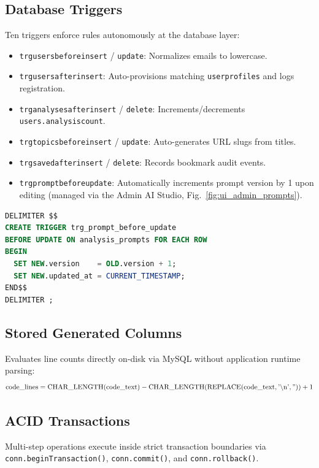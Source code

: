 \documentclass[12pt,a4paper]{report}
\DeclareRobustCommand{\_}{\textunderscore\allowbreak}
\begin{document}
\subsection{Database Triggers}
Ten triggers enforce rules autonomously at the database layer:
\begin{itemize}
    \item \texttt{trg\_users\_before\_insert} / \texttt{update}: Normalizes emails to lowercase.
    \item \texttt{trg\_users\_after\_insert}: Auto-provisions matching \texttt{user\_profiles} and logs registration.
    \item \texttt{trg\_analyses\_after\_insert} / \texttt{delete}: Increments/decrements \texttt{users.analysis\_count}.
    \item \texttt{trg\_topics\_before\_insert} / \texttt{update}: Auto-generates URL slugs from titles.
    \item \texttt{trg\_saved\_after\_insert} / \texttt{delete}: Records bookmark audit events.
    \item \texttt{trg\_prompt\_before\_update}: Automatically increments prompt version by 1 upon editing (managed via the Admin AI Studio, Fig.~\ref{fig:ui_admin_prompts}).
\end{itemize}

\begin{lstlisting}[language=SQL]
DELIMITER $$
CREATE TRIGGER trg_prompt_before_update
BEFORE UPDATE ON analysis_prompts FOR EACH ROW
BEGIN
  SET NEW.version    = OLD.version + 1;
  SET NEW.updated_at = CURRENT_TIMESTAMP;
END$$
DELIMITER ;
\end{lstlisting}

\subsection{Stored Generated Columns}
Evaluates line counts directly on-disk via MySQL without application runtime parsing:
\[
\text{code\_lines} = \text{CHAR\_LENGTH}(\text{code\_text}) - \text{CHAR\_LENGTH}(\text{REPLACE}(\text{code\_text}, \text{'\textbackslash n'}, \text{''})) + 1
\]

\subsection{ACID Transactions}
Multi-step operations execute inside strict transaction boundaries via \texttt{conn.beginTransaction()}, \texttt{conn.commit()}, and \texttt{conn.rollback()}.
\end{document}
